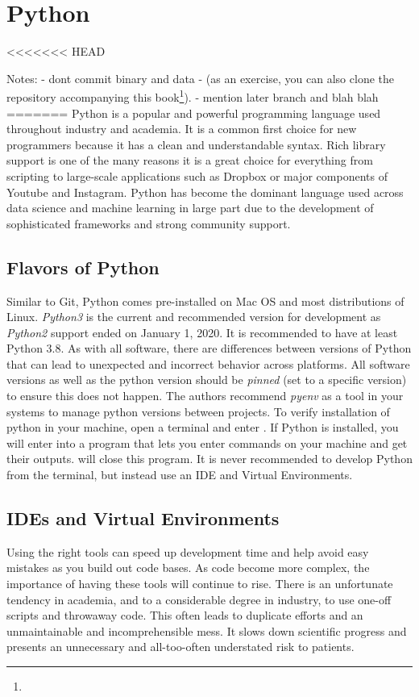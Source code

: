 \section{Python}
<<<<<<< HEAD

Notes:
- dont commit binary and data
- (as an exercise, you can also clone the repository accompanying this book\footnote{}).
- mention later branch and blah blah
=======
Python is a popular and powerful programming language used throughout industry and academia. It is a common first choice for new programmers because it has a clean and understandable syntax. Rich library support is one of the many reasons it is a great choice for everything from scripting to large-scale applications such as Dropbox or major components of Youtube and Instagram. Python has become the dominant language used across data science and machine learning in large part due to the development of sophisticated frameworks and strong community support.

\subsection{Flavors of Python}
Similar to Git, Python comes pre-installed on Mac OS and most distributions of Linux. \textit{Python3} is the current and recommended version for development as \textit{Python2} support ended on January 1, 2020.
It is recommended to have at least Python 3.8. As with all software, there are differences between versions of Python that can lead to unexpected and incorrect behavior across platforms.
All software versions as well as the python version should be \textit{pinned} (set to a specific version) to ensure this does not happen.
The authors recommend \textit{pyenv} as a tool in your systems to manage python versions between projects.
To verify installation of python in your machine, open a terminal and enter .
If Python is installed, you will enter into a program that lets you enter commands on your machine and get their outputs.  will close this program.
It is never recommended to develop Python from the terminal, but instead use an IDE and Virtual Environments.

\subsection{IDEs and Virtual Environments}

Using the right tools can speed up development time and help avoid easy mistakes as you build out code bases.
As code become more complex, the importance of having these tools will continue to rise.
There is an unfortunate tendency in academia, and to a considerable degree in industry, to use one-off scripts and throwaway code.
This often leads to duplicate efforts and an unmaintainable and incomprehensible mess.
It slows down scientific progress and presents an unnecessary and all-too-often understated risk to patients.

